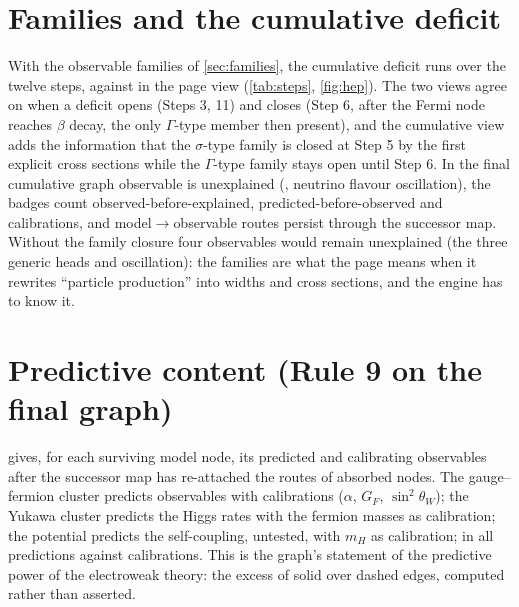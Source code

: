 \documentclass[11pt,a4paper,twoside,openany]{report}
\theoremstyle{plain}
\theoremstyle{definition}
\theoremstyle{remark}
\begin{document}
\section{Families and the cumulative deficit}
With the observable families of \cref{sec:families}, the cumulative deficit runs \NhepTrajUnexpCum{} over the twelve steps, against \NhepTrajUnexp{} in the page view (\cref{tab:steps}, \cref{fig:hep}). The two views agree on when a deficit opens (Steps 3, 11) and closes (Step 6, after the Fermi node reaches $\beta$ decay, the only $\Gamma$-type member then present), and the cumulative view adds the information that the $\sigma$-type family is closed at Step 5 by the first explicit cross sections while the $\Gamma$-type family stays open until Step 6. In the final cumulative graph \NhepUnexplainedFinal{} observable is unexplained (\NhepUnexplainedFinalList{}, neutrino flavour oscillation), the badges count \NhepBadgeA{} observed-before-explained, \NhepBadgeP{} predicted-before-observed and \NhepBadgeF{} calibrations, and \NhepMTwoOCumFinal{} model$\to$observable routes persist through the successor map. Without the family closure four observables would remain unexplained (the three generic heads and oscillation): the families are what the page means when it rewrites ``particle production'' into widths and cross sections, and the engine has to know it.

\section{Predictive content (Rule 9 on the final graph)}
\begin{table}[htbp]\centering\scriptsize
\caption{Rule 9 evaluated on the final cumulative graph: per surviving model node, the observables it predicts (an observable that calibrates the node is counted as a calibration, not a prediction), its calibrations and its framework assignments.}\label{tab:predictive}

\end{table}
 gives, for each surviving model node, its predicted and calibrating observables after the successor map has re-attached the routes of absorbed nodes. The gauge--fermion cluster predicts \NhepPCcgfpred{} observables with \NhepPCcgffit{} calibrations ($\alpha$, $G_F$, $\sin^2\theta_W$); the Yukawa cluster predicts the Higgs rates with the fermion masses as calibration; the potential predicts the self-coupling, untested, with $m_H$ as calibration; in all \NhepPCtotalPred{} predictions against \NhepPCtotalFit{} calibrations. This is the graph's statement of the predictive power of the electroweak theory: the excess of solid over dashed edges, computed rather than asserted.
\end{document}
